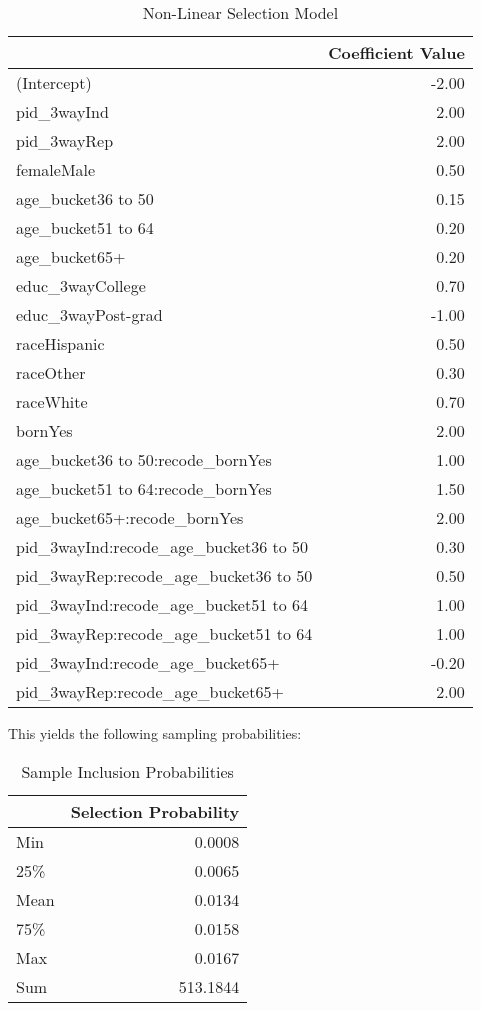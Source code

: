 \documentclass[
]{article}
\begin{document}
\begin{table}[!h]

\caption{\label{tab:r5_nonlin}Non-Linear Selection Model}
\centering
\begin{tabular}[t]{lr}
\toprule
  & Coefficient Value\\
\midrule
(Intercept) & -2.00\\
pid\_3wayInd & 2.00\\
pid\_3wayRep & 2.00\\
femaleMale & 0.50\\
age\_bucket36 to 50 & 0.15\\
\addlinespace
age\_bucket51 to 64 & 0.20\\
age\_bucket65+ & 0.20\\
educ\_3wayCollege & 0.70\\
educ\_3wayPost-grad & -1.00\\
raceHispanic & 0.50\\
\addlinespace
raceOther & 0.30\\
raceWhite & 0.70\\
bornYes & 2.00\\
age\_bucket36 to 50:recode\_bornYes & 1.00\\
age\_bucket51 to 64:recode\_bornYes & 1.50\\
\addlinespace
age\_bucket65+:recode\_bornYes & 2.00\\
pid\_3wayInd:recode\_age\_bucket36 to 50 & 0.30\\
pid\_3wayRep:recode\_age\_bucket36 to 50 & 0.50\\
pid\_3wayInd:recode\_age\_bucket51 to 64 & 1.00\\
pid\_3wayRep:recode\_age\_bucket51 to 64 & 1.00\\
\addlinespace
pid\_3wayInd:recode\_age\_bucket65+ & -0.20\\
pid\_3wayRep:recode\_age\_bucket65+ & 2.00\\
\bottomrule
\end{tabular}
\end{table}

This yields the following sampling probabilities:

\begin{table}[!h]

\caption{\label{tab:r5_nonlin}Sample Inclusion Probabilities}
\centering
\begin{tabular}[t]{lr}
\toprule
  & Selection Probability\\
\midrule
Min & 0.0008\\
25\% & 0.0065\\
Mean & 0.0134\\
75\% & 0.0158\\
Max & 0.0167\\
\addlinespace
Sum & 513.1844\\
\bottomrule
\end{tabular}
\end{table}
\end{document}
